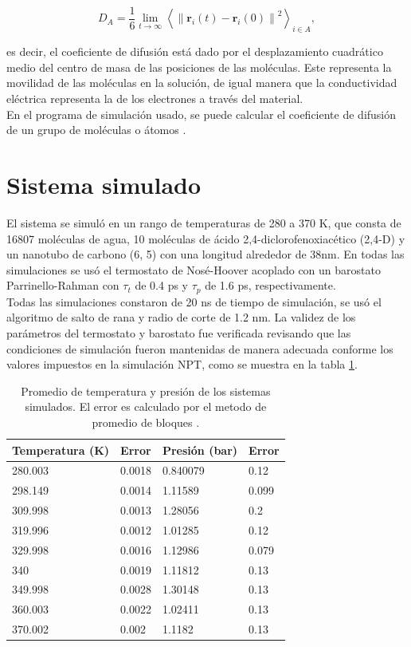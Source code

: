 \begin{equation} \label{diffusioncoeff}
    D_A = \frac{1}{6} \lim_{t \to \infty} \left\langle\left\| \mathbf{r}_{i}(t) - \mathbf{r}_{i}(0) \right\|^2 \right\rangle_{i \in A},
\end{equation}

\noindent es decir, el coeficiente de difusión está dado por el desplazamiento cuadrático medio del centro de masa de las posiciones de las moléculas. Este representa la movilidad de las moléculas en la solución, de igual manera que la conductividad eléctrica representa la de los electrones a través del material.\\

En el programa de simulación usado, se puede calcular el coeficiente de difusión de un grupo de moléculas o átomos \cite{gromacsdoc}.

\section{Sistema simulado}

El sistema se simuló en un rango de temperaturas de 280 a 370 K, que consta de 16807 moléculas de agua, 10 moléculas de ácido 2,4-diclorofenoxiacético (2,4-D) y un nanotubo de carbono (6, 5) con una longitud alrededor de 38nm. En todas las simulaciones se usó el termostato de Nosé-Hoover acoplado con un barostato Parrinello-Rahman con $\tau_t$ de 0.4 ps y $\tau_p$ de 1.6 ps, respectivamente.\\

Todas las simulaciones constaron de 20 ns de tiempo de simulación, se usó el algoritmo de salto de rana y radio de corte de 1.2 nm. La validez de los parámetros del termostato y barostato fue verificada revisando que las condiciones de simulación fueron mantenidas de manera adecuada conforme los valores impuestos en la simulación NPT, como se muestra en la tabla \ref{tab:promediostemppres}.

\begin{table}[h!]
    \centering
    \begin{tabular}{ |m{6em}|m{5em}||m{5em}|m{5em}|  }
    \hline
    Temperatura (K) & Error & Presión (bar) & Error \\
    \hline
    \hline
    280.003 & 0.0018 & 0.840079 & 0.12 \\
    298.149 & 0.0014 & 1.11589 & 0.099 \\
    309.998 & 0.0013 & 1.28056 & 0.2 \\
    319.996 & 0.0012 & 1.01285 & 0.12 \\
    329.998 & 0.0016 & 1.12986 & 0.079 \\
    340 & 0.0019 & 1.11812 & 0.13 \\
    349.998 & 0.0028 & 1.30148 & 0.13 \\
    360.003 & 0.0022 & 1.02411 & 0.13 \\
    370.002 & 0.002 & 1.1182 & 0.13 \\
    \hline
    \end{tabular}
    \caption{Promedio de temperatura y presión de los sistemas simulados. El error es calculado por el metodo de promedio de bloques \cite{gromacsdoc}.}
    \label{tab:promediostemppres}
\end{table}


